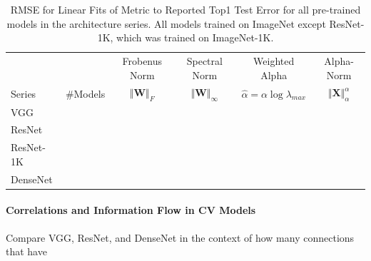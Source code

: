 \begin{table}[t]
\small
\begin{center}
\begin{tabular}{|p{1in}|c|c|c|c|c|}
\hline
   &    & Frobenus Norm & Spectral Norm & Weighted Alpha & Alpha-Norm \\
 Series & \#Models   & $\Vert\mathbf{W}\Vert_{F}$ & $\Vert\mathbf{W}\Vert_{\infty}$ & $\hat{\alpha}=\alpha\log\lambda_{max}$ & $\Vert\mathbf{X}\Vert^{\alpha}_{\alpha}$ \\
\hline
 VGG & & & & \\
 ResNet & & & & \\
 ResNet-1K & & & & \\
 DenseNet & & & & \\
\hline
\end{tabular}
\end{center}
\caption{RMSE for Linear Fits of Metric to Reported Top1 Test Error for all pre-trained models in the architecture series.  All models trained on ImageNet except ResNet-1K, which was trained on ImageNet-1K. }
\label{table:models}
\end{table}



\paragraph{Correlations and Information Flow in CV Models}

Compare VGG, ResNet, and DenseNet in the context of how many connections that have

